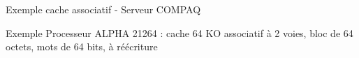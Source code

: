 %
\begin{Frame}{Exemple cache associatif - Serveur COMPAQ }

      \begin{block}{Exemple Processeur ALPHA 21264 : cache 64 KO associatif à 2 voies, bloc de 64 octets, mots de 64 bits, à réécriture}
      \end{block}   

\vspace{-0.85cm}
        \begin{center}
        \end{center}
      
\end{Frame}


